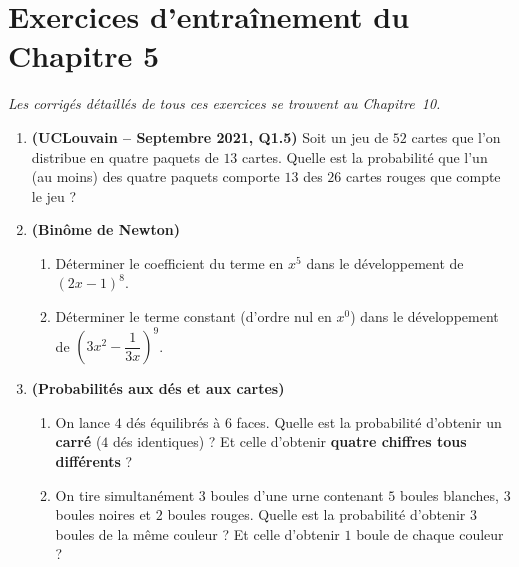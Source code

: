 \section{Exercices d'entraînement du Chapitre 5}

\emph{Les corrigés détaillés de tous ces exercices se trouvent au Chapitre~10.}

\begin{enumerate}[label=\textbf{Exercice 5.\arabic* :}, leftmargin=*]
    \item \textbf{(UCLouvain -- Septembre 2021, Q1.5)} Soit un jeu de $52$ cartes que l'on distribue en quatre paquets de $13$ cartes. Quelle est la probabilité que l'un (au moins) des quatre paquets comporte $13$ des $26$ cartes rouges que compte le jeu ?
    \item \textbf{(Binôme de Newton)}
    \begin{enumerate}[label=(\alph*)]
        \item Déterminer le coefficient du terme en $x^5$ dans le développement de $(2x - 1)^8$.
        \item Déterminer le terme constant (d'ordre nul en $x^0$) dans le développement de $\left(3x^2 - \dfrac{1}{3x}\right)^9$.
    \end{enumerate}
    \item \textbf{(Probabilités aux dés et aux cartes)}
    \begin{enumerate}[label=(\alph*)]
        \item On lance $4$ dés équilibrés à $6$ faces. Quelle est la probabilité d'obtenir un \textbf{carré} ($4$ dés identiques) ? Et celle d'obtenir \textbf{quatre chiffres tous différents} ?
        \item On tire simultanément $3$ boules d'une urne contenant $5$ boules blanches, $3$ boules noires et $2$ boules rouges. Quelle est la probabilité d'obtenir $3$ boules de la même couleur ? Et celle d'obtenir $1$ boule de chaque couleur ?
    \end{enumerate}
\end{enumerate}
